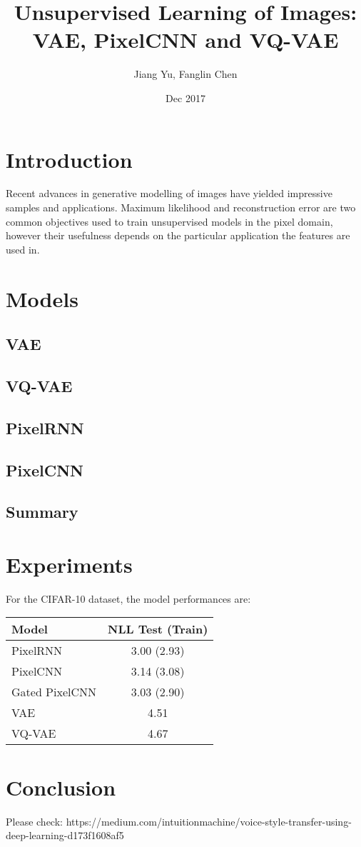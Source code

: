 \documentclass[11pt,a4paper]{article}
\begin{document}
\title{Unsupervised Learning of Images:\\VAE, PixelCNN and VQ-VAE}
\author{Jiang Yu, Fanglin Chen}
\date{Dec 2017}
\maketitle

\section{Introduction}
Recent advances in generative modelling of images have yielded impressive samples and applications. Maximum likelihood and reconstruction error are two common objectives used to train unsupervised models in the pixel domain, however their usefulness depends on the particular application the features are used in.

\section{Models}
\subsection{VAE}
\subsection{VQ-VAE}
\subsection{PixelRNN}
\subsection{PixelCNN}
\subsection{Summary}

\section{Experiments}
For the CIFAR-10 dataset, the model performances are:\\
\begin{tabular}{lc}
	\hline Model & NLL Test (Train) \\
	\hline PixelRNN & 3.00 (2.93) \\
	\hline PixelCNN & 3.14 (3.08) \\
	\hline Gated PixelCNN & 3.03 (2.90) \\
	\hline VAE & 4.51 \\
	\hline VQ-VAE & 4.67 \\
	\hline 
\end{tabular}

\section{Conclusion}
Please check: 
https://medium.com/intuitionmachine/voice-style-transfer-using-deep-learning-d173f1608af5
\end{document}
